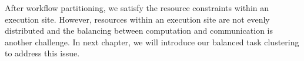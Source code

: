 After workflow partitioning, we satisfy the resource constraints within an execution site. However, resources within an execution site are not evenly distributed and the balancing between computation and communication is another challenge. In next chapter, we will introduce our balanced task clustering to address this issue. 

